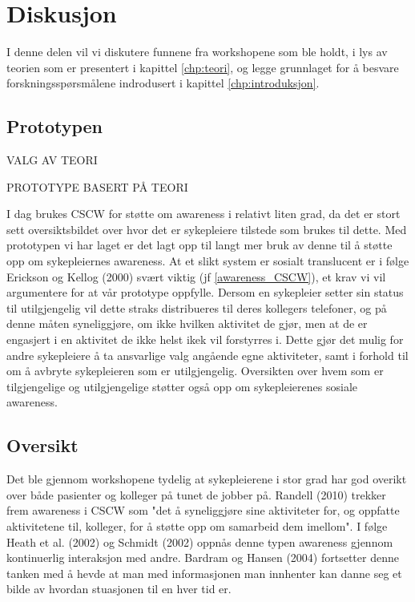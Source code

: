 \chapter{Diskusjon}
\label{chp:diskusjon}
I denne delen vil vi diskutere funnene fra workshopene som ble holdt, i lys av teorien som er presentert i kapittel \ref{chp:teori}, og legge grunnlaget for å besvare forskningsspørsmålene indrodusert i kapittel \ref{chp:introduksjon}.

\section{Prototypen}
\label{protoDisk}

VALG AV TEORI

PROTOTYPE BASERT PÅ TEORI

\noindent
I dag brukes CSCW for støtte om awareness i relativt liten grad, da det er stort sett oversiktsbildet over hvor det er sykepleiere tilstede som brukes til dette. Med prototypen vi har laget er det lagt opp til langt mer bruk av denne til å støtte opp om sykepleiernes awareness. At et slikt system er sosialt translucent er i følge Erickson og Kellog (2000) svært viktig (jf \ref{awareness_CSCW}), et krav vi vil argumentere for at vår prototype oppfylle. Dersom en sykepleier setter sin status til utilgjengelig vil dette straks distribueres til deres kollegers telefoner, og på denne måten syneliggjøre, om ikke hvilken aktivitet de gjør, men at de er engasjert i en aktivitet de ikke helst ikek vil forstyrres i. Dette gjør det mulig for andre sykepleiere å ta ansvarlige valg angående egne aktiviteter, samt i forhold til om å avbryte sykepleieren som er utilgjengelig. Oversikten over hvem som er tilgjengelige og utilgjengelige støtter også opp om sykepleierenes sosiale awareness.

\section{Oversikt}
\label{oversikt}
Det ble gjennom workshopene tydelig at sykepleierene i stor grad har god overikt over både pasienter og kolleger på tunet de jobber på. Randell (2010) trekker frem awareness i CSCW som "det å syneliggjøre sine aktiviteter for, og oppfatte aktivitetene til, kolleger, for å støtte opp om samarbeid dem imellom". I følge Heath et al. (2002) og Schmidt (2002) oppnås denne typen awareness gjennom kontinuerlig interaksjon med andre. Bardram og Hansen (2004) fortsetter denne tanken med å hevde at man med informasjonen man innhenter kan danne seg et bilde av hvordan stuasjonen til en hver tid er.

